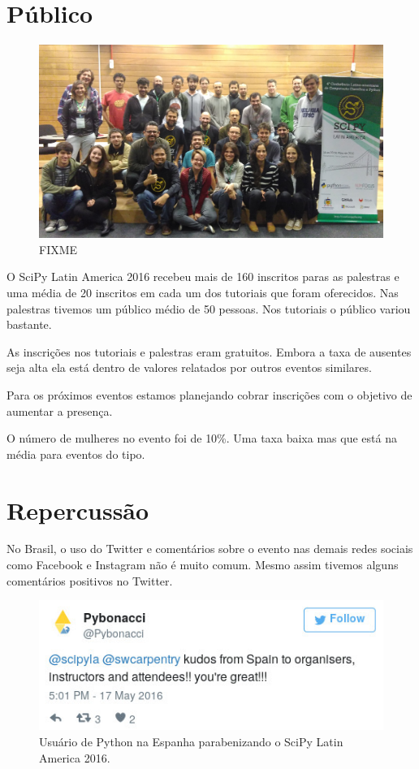 \documentclass[12pt]{article}
\begin{document}
\clearpage
\newpage

\section*{Público}

\begin{figure}[!htb]
\center
\includegraphics[height=.3\textheight]{group.jpg}
\caption{FIXME}
\end{figure}

O SciPy Latin America 2016 recebeu mais de 160 inscritos paras as palestras e
uma média de 20 inscritos em cada um dos tutoriais que foram oferecidos.
Nas palestras tivemos um público médio de 50 pessoas. Nos tutoriais o público
variou bastante.

As inscrições nos tutoriais e palestras eram gratuitos. Embora a taxa de
ausentes seja alta ela está dentro de valores relatados por outros eventos
similares.

Para os próximos eventos estamos planejando cobrar inscrições com o objetivo de
aumentar a presença.

O número de mulheres no evento foi de 10\%. Uma taxa baixa mas que está na média
para eventos do tipo.

\clearpage
\newpage

\section*{Repercussão}

No Brasil, o uso do Twitter e comentários sobre o evento nas demais redes
sociais como Facebook e Instagram não é muito comum. Mesmo assim tivemos alguns
comentários positivos no Twitter.

\begin{figure}[!htb]
\center
\includegraphics[height=.3\textheight]{tweet-kudos.jpg}
\caption{Usuário de Python na Espanha parabenizando o SciPy Latin America 2016.}
\end{figure}
\end{document}
